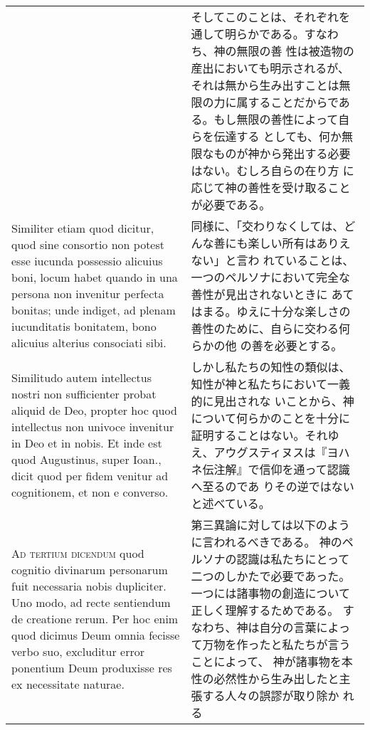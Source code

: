 \documentclass[10pt]{jsarticle} %
\begin{document}
\begin{longtable}{p{21em}p{21em}}
&

そしてこのことは、それぞれを通して明らかである。すなわち、神の無限の善
 性は被造物の産出においても明示されるが、それは無から生み出すことは無
 限の力に属することだからである。もし無限の善性によって自らを伝達する
としても、何か無限なものが神から発出する必要はない。むしろ自らの在り方
 に応じて神の善性を受け取ることが必要である。


\\


Similiter etiam quod dicitur, quod sine consortio non
potest esse iucunda possessio alicuius boni, locum habet quando in una
persona non invenitur perfecta bonitas; unde indiget, ad plenam
iucunditatis bonitatem, bono alicuius alterius consociati
sibi. 


&

同様に、「交わりなくしては、どんな善にも楽しい所有はありえない」と言わ
 れていることは、一つのペルソナにおいて完全な善性が見出されないときに
 あてはまる。ゆえに十分な楽しさの善性のために、自らに交わる何らかの他
 の善を必要とする。


\\


Similitudo autem intellectus nostri non sufficienter probat
aliquid de Deo, propter hoc quod intellectus non univoce invenitur in
Deo et in nobis. Et inde est quod Augustinus, super Ioan., dicit quod
per fidem venitur ad cognitionem, et non e converso.


&

しかし私たちの知性の類似は、知性が神と私たちにおいて一義的に見出されな
 いことから、神について何らかのことを十分に証明することはない。それゆ
 え、アウグスティヌスは『ヨハネ伝注解』で信仰を通って認識へ至るのであ
 りその逆ではないと述べている。

\\



{\scshape Ad tertium dicendum} quod cognitio divinarum personarum fuit necessaria
nobis dupliciter. Uno modo, ad recte sentiendum de creatione
rerum. Per hoc enim quod dicimus Deum omnia fecisse verbo suo,
excluditur error ponentium Deum produxisse res ex necessitate
naturae. 


&

第三異論に対しては以下のように言われるべきである。
神のペルソナの認識は私たちにとって二つのしかたで必要であった。
一つには諸事物の創造について正しく理解するためである。
すなわち、神は自分の言葉によって万物を作ったと私たちが言うことによって、
 神が諸事物を本性の必然性から生み出したと主張する人々の誤謬が取り除か
 れる



\end{longtable}
\end{document}
